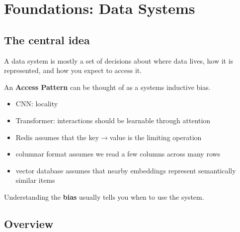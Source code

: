 \chapter{Foundations: Data Systems}
\label{chap:data-systems}

\section{The central idea}
\label{sec:data-systems-central-idea}

A data system is mostly a set of decisions about where data lives, how it is represented, and how you expect to access it.

An \textbf{Access Pattern} can be thought of as a systems inductive bias.
\begin{itemize}
    \item CNN: locality
    \item Transformer: interactions should be learnable through attention
    \item Redis assumes that the key$\rightarrow$value is the limiting operation
    \item columnar format assumes we read a few columns across many rows
    \item vector database assumes that nearby embeddings represent semantically similar items
\end{itemize}

Understanding the \textbf{bias} usually tells you when to use the system.

\section{Overview}
\label{sec:data-systems-overview}

